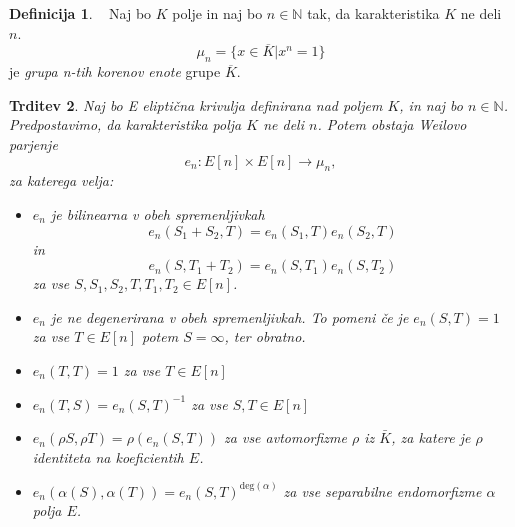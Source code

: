 \documentclass[12pt,a4paper,twoside]{article}
\theoremstyle{definition} %
\newtheorem{definicija}{Definicija}[section]
\theoremstyle{plain} %
\newtheorem{trditev}[definicija]{Trditev}
\numberwithin{equation}{section}  %
\newcommand{\N}{\mathbb N}
\begin{document}
\begin{definicija}~
Naj bo $K$ polje in naj bo $n \in \N$ tak, da karakteristika $K$ ne deli $n$.
$$\mu_n = \{ x \in \overline{K} | x^n = 1 \}$$
je \emph{grupa n-tih korenov enote} grupe $\overline{K}$.
\end{definicija}

\begin{trditev}
\label{trd-WeilPar}
Naj bo E eliptična krivulja definirana nad poljem $K$, in naj bo $n \in \N$. Predpostavimo, da karakteristika polja $K$ ne deli $n$. Potem obstaja Weilovo parjenje
$$e_n:E[n] \times E[n] \rightarrow \mu_n,$$
za katerega velja:
\begin{itemize}
\item $e_n$ je bilinearna v obeh spremenljivkah
$$e_n(S_1+S_2,T) = e_n(S_1,T)e_n(S_2,T)$$
in
$$e_n(S,T_1+T_2) = e_n(S,T_1)e_n(S,T_2)$$
za vse $S,S_1,S_2,T,T_1,T_2 \in E[n]$.
\item $e_n$ je ne degenerirana v obeh spremenljivkah. To pomeni če je $e_n(S,T) = 1$ za vse $T \in E[n]$ potem $S = \infty$, ter obratno.

\item $e_n(T,T) = 1$ za vse $T \in E[n]$

\item $e_n(T,S) = e_n(S,T)^{-1}$ za vse $S,T \in E[n]$

\item $e_n(\rho S,\rho T) = \rho(e_n(S,T))$ za vse avtomorfizme $\rho$ iz $\bar{K}$, za katere je $\rho$ identiteta na koeficientih $E$.

\item $e_n(\alpha(S),\alpha(T)) = e_n(S,T)^{\text{deg}(\alpha)}$ za vse separabilne endomorfizme $\alpha$ polja $E$.
\end{itemize}

\end{trditev}
\end{document}
